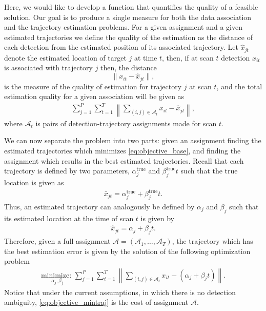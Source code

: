 Here, we would like to develop a function that quantifies the quality of a feasible solution. Our goal is to produce a single measure for both the data association and the trajectory estimation problems. For a given assignment and a given estimated trajectories we define the quality of the estimation as the distance of each detection from the estimated position of its associated trajectory. Let $\hat{x}_{jt}$ denote the estimated location of target $j$ at time $t$, then, if at scan $t$ detection $x_{it}$ is associated with trajectory $j$ then, the distance 
$$\|x_{it}-\hat{x}_{jt}\|,$$
is the measure of the quality of estimation for trajectory $j$ at scan $t$, and the total estimation quality for a given association will be given as 
\begin{align}\label{eq:objective_base}
\sum_{j=1}^P\sum_{t=1}^T\left\|\sum_{(i,j)\in \mathcal{A}_{t}} x_{it} - \hat{x}_{jt}\right\|,
\end{align} 
where $\mathcal{A}_t$ is pairs of detection-trajectory assignments made for scan $t$. 

We can now separate the problem into two parts: given an assignment finding the estimated trajectories which minimizes \eqref{eq:objective_base}, and finding the assignment which results in the best estimated trajectories. Recall that each trajectory is defined by two parameters, $\alpha^{\text{true}}_{j}$ and $\beta^{\text{true}}_{j}t$ such that the true location is given as 
\begin{align}
	\bar{x}_{jt} = \alpha^{\text{true}}_{j} + \beta^{\text{true}}_{j}t.
\end{align}
Thus, an estimated trajectory can analogously be defined by  $\alpha_{j}$ and $\beta_{j}$ such that its estimated location at the time of scan $t$ is given by
\begin{align}
	\hat{x}_{jt} =  \alpha_{j} + \beta_{j}t.
\end{align}
Therefore, given a full assignment  $\mathcal{A}=(\mathcal{A}_1,\ldots,\mathcal{A}_T)$, the trajectory which has the best estimation error is given by the solution of the following optimization problem
\begin{align}\label{eq:objective_mintraj}
\underset{\alpha_{j}, \beta_{j}}{\text{minimize: }}\sum_{j=1}^P\sum_{t=1}^T\left\|\sum_{(i,j)\in \mathcal{A}_{t}} x_{it} - (\alpha_{j} + \beta_{j}t)\right\|.
\end{align} 
Notice that under the current assumptions, in which there is no detection ambiguity, \eqref{eq:objective_mintraj} is the cost of assignment $\mathcal{A}$. 

